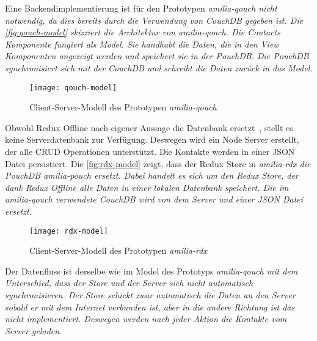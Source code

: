 %
% 
%
Eine Backendimplementierung ist für den Prototypen \it{amilia-qouch} nicht notwendig, da dies bereits durch die Verwendung von CouchDB gegeben ist.
Die \autoref{fig:qouch-model} skizziert die Architektur von \it{amilia-qouch}. Die Contacts Komponente fungiert als Model. Sie handhabt die Daten, die in den View Komponenten angezeigt werden und speichert sie in der PouchDB. Die PouchDB synchronisiert sich mit der CouchDB und schreibt die Daten zurück in das Model.
\begin{figure}[H]
  \centering
  \texttt{[image: qouch-model]}
  \grayRule
  \caption{Client-Server-Modell des Prototypen \it{amilia-qouch}}
  \label{fig:qouch-model}
\end{figure}
%
Obwohl Redux Offline nach eigener Aussage die Datenbank ersetzt~\cite{redux-offline}, stellt es keine Serverdatenbank zur Verfügung.
Deswegen wird ein Node Server erstellt, der alle \gls{CRUD} Operationen unterstützt.
Die Kontakte werden in einer \gls{JSON} Datei persistiert.
Die \autoref{fig:rdx-model} zeigt, dass der Redux Store in \it{amilia-rdx} die PouchDB \it{amilia-pouch} ersetzt.
Dabei handelt es sich um den Redux Store, der dank Redux Offline alle Daten in einer lokalen Datenbank speichert.
Die im \it{amilia-qouch} verwendete CouchDB wird von dem Server und einer \gls{JSON} Datei ersetzt.
%
\begin{figure}[H]
  \centering
  \texttt{[image: rdx-model]}
  \grayRule
  \caption{Client-Server-Modell des Prototypen \it{amilia-rdx}}
  \label{fig:rdx-model}
\end{figure}
% 
Der Datenfluss ist derselbe wie im Model des Prototyps \it{amilia-qouch} mit dem Unterschied, dass der Store und der Server sich nicht automatisch synchronisieren.
Der Store schickt zwar automatisch die Daten an den Server sobald er mit dem Internet verbunden ist, aber in die andere Richtung ist das nicht implementiert.
Deswegen werden nach jeder Aktion die Kontakte vom Server geladen.
